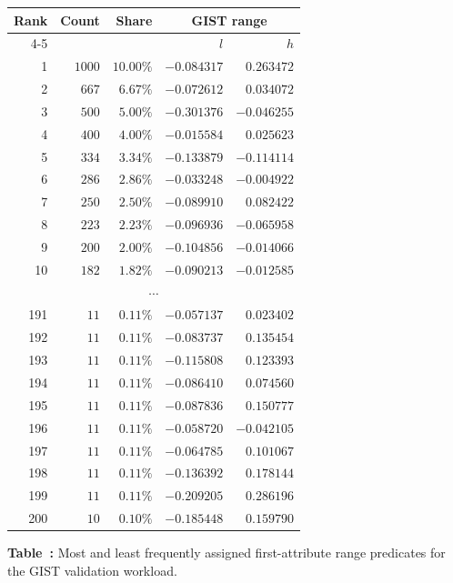 \begin{center}
\renewcommand{\arraystretch}{1.12}
    \begin{tabular}{rrrrr}
        \toprule
        Rank & Count & Share & \multicolumn{2}{c}{\textsc{GIST} range} \\
        \cmidrule(lr){4-5}
             &       &       & \(l\) & \(h\) \\
        \midrule
        1   & \(1000\) & \(10.00\%\) & \(-0.084317\) & \( 0.263472\) \\
        2   & \(667\)  & \( 6.67\%\) & \(-0.072612\) & \( 0.034072\) \\
        3   & \(500\)  & \( 5.00\%\) & \(-0.301376\) & \(-0.046255\) \\
        4   & \(400\)  & \( 4.00\%\) & \(-0.015584\) & \( 0.025623\) \\
        5   & \(334\)  & \( 3.34\%\) & \(-0.133879\) & \(-0.114114\) \\
        6   & \(286\)  & \( 2.86\%\) & \(-0.033248\) & \(-0.004922\) \\
        7   & \(250\)  & \( 2.50\%\) & \(-0.089910\) & \( 0.082422\) \\
        8   & \(223\)  & \( 2.23\%\) & \(-0.096936\) & \(-0.065958\) \\
        9   & \(200\)  & \( 2.00\%\) & \(-0.104856\) & \(-0.014066\) \\
        10  & \(182\)  & \( 1.82\%\) & \(-0.090213\) & \(-0.012585\) \\
        \midrule
        \multicolumn{5}{c}{\(\cdots\)} \\
        \midrule
        191 & \(11\)   & \( 0.11\%\) & \(-0.057137\) & \( 0.023402\) \\
        192 & \(11\)   & \( 0.11\%\) & \(-0.083737\) & \( 0.135454\) \\
        193 & \(11\)   & \( 0.11\%\) & \(-0.115808\) & \( 0.123393\) \\
        194 & \(11\)   & \( 0.11\%\) & \(-0.086410\) & \( 0.074560\) \\
        195 & \(11\)   & \( 0.11\%\) & \(-0.087836\) & \( 0.150777\) \\
        196 & \(11\)   & \( 0.11\%\) & \(-0.058720\) & \(-0.042105\) \\
        197 & \(11\)   & \( 0.11\%\) & \(-0.064785\) & \( 0.101067\) \\
        198 & \(11\)   & \( 0.11\%\) & \(-0.136392\) & \( 0.178144\) \\
        199 & \(11\)   & \( 0.11\%\) & \(-0.209205\) & \( 0.286196\) \\
        200 & \(10\)   & \( 0.10\%\) & \(-0.185448\) & \( 0.159790\) \\
        \bottomrule
    \end{tabular}
\vspace{0.4em}
\label{tab:gist-range-frequency}
\parbox{0.92\textwidth}{\centering\small
\textbf{Table~\thetable:} Most and least frequently assigned first-attribute range predicates for the \textsc{GIST} validation workload.}
\end{center}

